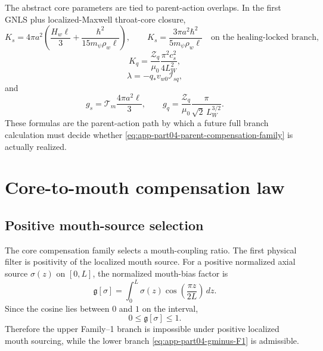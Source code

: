 The abstract core parameters are tied to parent-action overlaps.  In the first GNLS plus localized-Maxwell throat-core closure,
\begin{equation}
\label{eq:app-part04-Ks-parent}
K_s=4\pi a^2\left(\frac{H_w\ell}{3}+\frac{\hbar^2}{15m_\psi\rho_w\ell}\right),
\qquad
K_s=\frac{3\pi a^2\hbar^2}{5m_\psi\rho_w\ell}
\quad\text{on the healing-locked branch},
\end{equation}
\begin{equation}
\label{eq:app-part04-Kq-parent}
K_q=\frac{\mathcal Z_q}{\mu_0}\frac{\pi^2c_s^2}{4L_W^2},
\end{equation}
\begin{equation}
\label{eq:app-part04-lambda-parent}
\lambda=-q_*v_{w0}\mathcal I_{sq},
\end{equation}
and
\begin{equation}
\label{eq:app-part04-gs-gq-parent}
g_s=\mathcal T_m\frac{4\pi a^2\ell}{3},
\qquad
g_q=\frac{\mathcal Z_q}{\mu_0}\frac{\pi}{\sqrt2\,L_W^{3/2}}.
\end{equation}
These formulas are the parent-action path by which a future full branch calculation must decide whether \eqref{eq:app-part04-parent-compensation-family} is actually realized.

\section{Core-to-mouth compensation law}
\label{sec:app-part04_geometry_retarded_mouth:core-to-mouth-compensation-law}

\subsection{Positive mouth-source selection}
\label{subsec:app-part04-positive-mouth-selection}

The core compensation family selects a mouth-coupling ratio.  The first physical filter is positivity of the localized mouth source.  For a positive normalized axial source \(\sigma(z)\) on \([0,L]\), the normalized mouth-bias factor is
\begin{equation}
\label{eq:app-part04-gsigma-def}
\mathfrak g[\sigma]
=
\int_0^L\sigma(z)\cos\left(\frac{\pi z}{2L}\right)\,dz.
\end{equation}
Since the cosine lies between \(0\) and \(1\) on the interval,
\begin{equation}
\label{eq:app-part04-positive-source-bound}
0\le\mathfrak g[\sigma]\le1.
\end{equation}
Therefore the upper Family--1 branch is impossible under positive localized mouth sourcing, while the lower branch \eqref{eq:app-part04-gminus-F1} is admissible.


